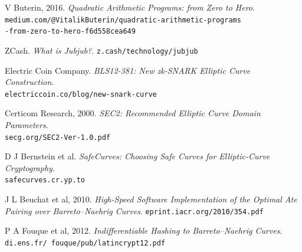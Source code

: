 \documentclass[11pt]{article}
\begin{document}
\begin{thebibliography}{20}
V Buterin, 2016. \emph{Quadratic Arithmetic Programs: from Zero to Hero}. \\ \texttt{medium.com/@VitalikButerin/quadratic-arithmetic-programs} \\ \texttt{-from-zero-to-hero-f6d558cea649}

ZCash. \emph{What is Jubjub?}.
\texttt{z.cash/technology/jubjub}

Electric Coin Company. \emph{BLS12-381: New zk-SNARK Elliptic Curve Construction}. \\
\texttt{electriccoin.co/blog/new-snark-curve}

Certicom Research, 2000. \emph{SEC2: Recommended Elliptic Curve Domain Parameters}. \\
\texttt{secg.org/SEC2-Ver-1.0.pdf}

D J Bernstein et al. \emph{SafeCurves: Choosing Safe Curves for Elliptic-Curve Cryptography}. \\
\texttt{safecurves.cr.yp.to}

J L Beuchat et al, 2010. \emph{High-Speed Software Implementation of the Optimal Ate Pairing over Barreto–Naehrig Curves}. \texttt{eprint.iacr.org/2010/354.pdf}

P A Fouque et al, 2012. \emph{Indifferentiable Hashing to Barreto–Naehrig Curves}. \\
\texttt{di.ens.fr/~fouque/pub/latincrypt12.pdf}

\end{thebibliography}
\end{document}
